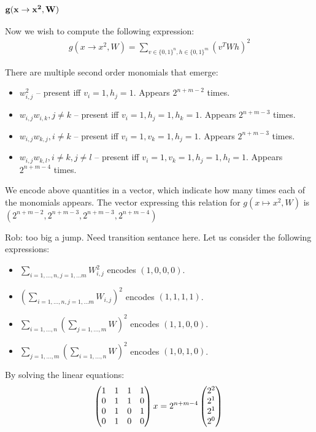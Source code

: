 \subsubsection{$\bf g(x \rightarrow x^2, W)$}

Now we wish to compute the following expression: 
\begin{gather*}
	g(x \rightarrow x^2, W) = \sum_{v \in \{0, 1\}^n, h \in \{0, 1\}^m} (v^TWh)^2
\end{gather*}

There are multiple second order monomials that emerge: 

\begin{itemize}
	\item $w_{i,j}^2$ -- present iff $v_i = 1, h_j = 1$. Appears $2^{n + m - 2}$ times.
	\item $w_{i,j} w_{i, k}, j \neq k$ -- present iff $v_i = 1, h_j = 1, h_k = 1$. Appears $2^{n + m - 3}$ times.	
	\item $w_{i,j} w_{k, j}, i \neq k$ -- present iff $v_i = 1, v_k = 1, h_j = 1$. Appears $2^{n + m - 3}$ times.
	\item $w_{i,j} w_{k, l}, i \neq k, j \neq l$ -- present iff $v_i = 1, v_k = 1, h_j = 1, h_l = 1$. Appears $2^{n + m - 4}$ times.			
\end{itemize}
We encode above quantities in a vector, which indicate how many times
each of the monomials 
appears. The vector expressing this relation for $g(x \mapsto x^2, W)$ is $(2^{n + m - 2}, 2^{n + m - 3}, 2^{n + m - 3}, 2^{n + m - 4})$

Rob: too big a jump. Need transition sentance here.
Let us consider the following expressions: 
\begin{itemize}
 \item $\sum_{i = 1, \dots, n, j = 1, \dots m} W_{i, j}^2$ encodes $(1, 0, 0, 0)$. 
 \item $(\sum_{i = 1, \dots, n, j = 1, \dots m} W_{i, j})^2$ encodes $(1, 1, 1, 1)$.
 \item $\sum_{i = 1, \dots, n}(\sum_{j = 1, \dots, m} W)^2$ encodes $(1, 1, 0, 0)$. 
 \item $\sum_{j = 1, \dots, m}(\sum_{i = 1, \dots, n} W)^2$ encodes
   $(1, 0, 1, 0)$.
\end{itemize}
 
 By solving the linear equations:
 \begin{equation}
 \begin{pmatrix} 
  1 & 1 & 1 & 1 \\ 
  0 & 1 & 1 & 0 \\ 
  0 & 1 & 0 & 1 \\ 
  0 & 1 & 0 & 0 \\     
\end{pmatrix}x = 2^{n + m - 4}\begin{pmatrix} 
  2^{2}\\ 
  2^{1}\\ 
  2^{1}\\ 
  2^{0}\\     
\end{pmatrix} \\
 \end{equation}

